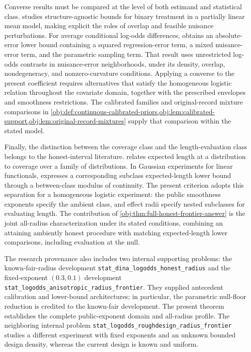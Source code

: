 \documentclass[11pt]{article}
\begin{document}
Converse results must be compared at the level of both estimand and statistical class. \citet[Appendix B]{JinMackeySyrgkanis2025HardNormal} studies structure-agnostic bounds for binary treatment in a partially linear mean model, making explicit the roles of overlap and feasible nuisance perturbations. For average conditional log-odds differences, \citet[version 2, Theorem 7.7]{JinSyrgkanis2025GeneralLinearLower} obtains an absolute-error lower bound containing a squared regression-error term, a mixed nuisance-error term, and the parametric sampling term. That result uses unrestricted log-odds contrasts in nuisance-error neighborhoods, under its density, overlap, nondegeneracy, and nonzero-curvature conditions. Applying a converse to the present coefficient requires alternatives that satisfy the homogeneous logistic relation throughout the covariate domain, together with the prescribed envelopes and smoothness restrictions. The calibrated families and original-record mixture comparisons in \cref{obj:def:continuous-calibrated-priors,obj:lem:calibrated-support,obj:lem:original-record-mixtures} supply that comparison within the stated model.

Finally, the distinction between the coverage class and the length-evaluation class belongs to the honest-interval literature. \citet{Low1997} relates expected length at a distribution to coverage over a family of distributions. In Gaussian experiments for linear functionals, \citet[Section 2, Theorem 1]{CaiLow2004ConfidenceAdaptation} expresses a corresponding subclass expected-length lower bound through a between-class modulus of continuity. The present criterion adopts this separation for a homogeneous logistic experiment: the public smoothness exponents specify the ambient class, and effect radii specify nested subclasses for evaluating length. The contribution of \cref{obj:thm:full-honest-frontier-answer} is the joint all-radius characterization under its stated conditions, combining an attaining ambiently honest procedure with matching expected-length lower comparisons, including evaluation at the null.

The research provenance also includes two internal supporting problems: the known-fair-radius development \texttt{stat\_dina\_logodds\_honest\_radius} and the fixed-exponent \((0.3,0.1)\) development \texttt{stat\_logodds\_anisotropic\_radius\_frontier}. They supplied antecedent calibration and lower-bound architectures; in particular, the parametric null-floor reduction is credited to the known-fair development. The present theorem establishes the complete public-exponent domain and all-radius profile. The neighboring internal problem \texttt{stat\_logodds\_roughdesign\_radius\_frontier} studies a different experiment with fixed exponents and an unknown bounded design density, whereas the current design is known and uniform.
\end{document}
